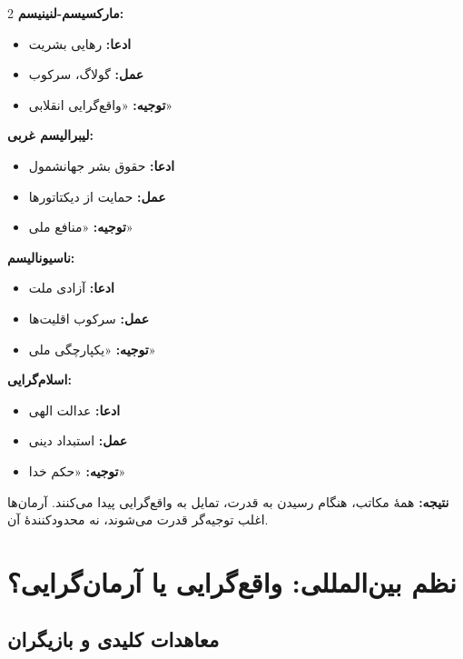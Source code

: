 \begin{tcolorbox}[
    enhanced,
    colback=leftred!8,
    colframe=leftred,
    boxrule=1.5pt,
    arc=5pt,
    fonttitle=\bfseries,
    title={\rl{🔴 تحلیل انتقادی: تناقضات}}
]
\begin{multicols}{2}
\textbf{مارکسیسم-لنینیسم:}
\begin{itemize}
    \item \textbf{ادعا:} رهایی بشریت
    \item \textbf{عمل:} گولاگ، سرکوب
    \item \textbf{توجیه:} «واقع‌گرایی انقلابی»
\end{itemize}

\textbf{لیبرالیسم غربی:}
\begin{itemize}
    \item \textbf{ادعا:} حقوق بشر جهانشمول
    \item \textbf{عمل:} حمایت از دیکتاتورها
    \item \textbf{توجیه:} «منافع ملی»
\end{itemize}

\columnbreak

\textbf{ناسیونالیسم:}
\begin{itemize}
    \item \textbf{ادعا:} آزادی ملت
    \item \textbf{عمل:} سرکوب اقلیت‌ها
    \item \textbf{توجیه:} «یکپارچگی ملی»
\end{itemize}

\textbf{اسلام‌گرایی:}
\begin{itemize}
    \item \textbf{ادعا:} عدالت الهی
    \item \textbf{عمل:} استبداد دینی
    \item \textbf{توجیه:} «حکم خدا»
\end{itemize}
\end{multicols}

\vspace{3mm}
\textbf{نتیجه:} همهٔ مکاتب، هنگام رسیدن به قدرت، تمایل به واقع‌گرایی پیدا می‌کنند. آرمان‌ها اغلب توجیه‌گر قدرت می‌شوند، نه محدودکنندهٔ آن.
\end{tcolorbox}

\section{نظم بین‌المللی: واقع‌گرایی یا آرمان‌گرایی؟}

\subsection{معاهدات کلیدی و بازیگران}

